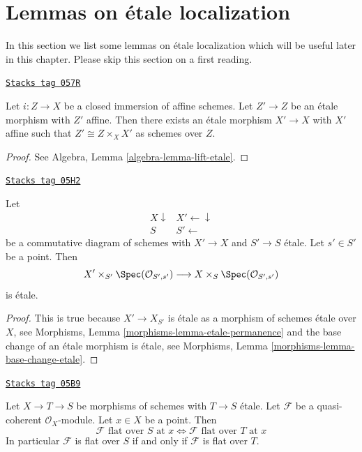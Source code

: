 \section{Lemmas on \'etale localization}
\label{flat-section-etale-localization}
In this section we list some lemmas on \'etale localization which will be
useful later in this chapter. Please skip this section on a first reading.

\begin{lemma}
\label{flat-lemma-lift-etale}
\href{https://stacks.math.columbia.edu/tag/057R}{\texttt{Stacks tag 057R}}

Let $i : Z \to X$ be a closed immersion of affine schemes.
Let $Z' \to Z$ be an \'etale morphism with $Z'$ affine.
Then there exists an \'etale morphism $X' \to X$ with $X'$
affine such that $Z' \cong Z \times_X X'$ as schemes over $Z$.
\end{lemma}

\begin{proof}
See
Algebra, Lemma \ref{algebra-lemma-lift-etale}.
\end{proof}

\begin{lemma}
\label{flat-lemma-etale-at-point}
\href{https://stacks.math.columbia.edu/tag/05H2}{\texttt{Stacks tag 05H2}}

Let
$$
\begin{array}{cc}X \downarrow & X' \longleftarrow\downarrow \\ S & S' \longleftarrow\end{array}
$$
be a commutative diagram of schemes with $X' \to X$ and $S' \to S$ \'etale.
Let $s' \in S'$ be a point. Then
$$
X' \times_{S'} \Spec(\mathcal{O}_{S', s'})
\longrightarrow
X \times_S \Spec(\mathcal{O}_{S', s'})
$$
is \'etale.
\end{lemma}

\begin{proof}
This is true because $X' \to X_{S'}$ is \'etale as a morphism of
schemes \'etale over $X$, see
Morphisms, Lemma \ref{morphisms-lemma-etale-permanence}
and the base change of an \'etale morphism is \'etale, see
Morphisms, Lemma \ref{morphisms-lemma-base-change-etale}.
\end{proof}

\begin{lemma}
\label{flat-lemma-etale-flat-up-down}
\href{https://stacks.math.columbia.edu/tag/05B9}{\texttt{Stacks tag 05B9}}

Let $X \to T \to S$ be morphisms of schemes with $T \to S$ \'etale.
Let $\mathcal{F}$ be a quasi-coherent $\mathcal{O}_X$-module.
Let $x \in X$ be a point. Then
$$
\mathcal{F}\text{ flat over }S\text{ at }x
\Leftrightarrow
\mathcal{F}\text{ flat over }T\text{ at }x
$$
In particular $\mathcal{F}$ is flat over $S$ if and only if $\mathcal{F}$
is flat over $T$.
\end{lemma}

